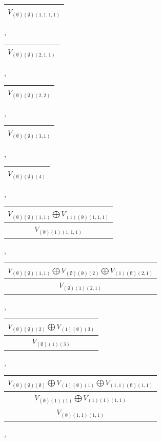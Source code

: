 \documentclass[letterpaper,11pt]{article}
\begin{document}
	\begin{tabular}{| c |}
		\hline
		$V_{(\emptyset)(\emptyset)(1,1,1,1)}$\\
		\hline
	\end{tabular}, 
	\begin{tabular}{| c |}
		\hline
		$V_{(\emptyset)(\emptyset)(2,1,1)}$\\
		\hline
	\end{tabular}, 
	\begin{tabular}{| c |}
		\hline
		$V_{(\emptyset)(\emptyset)(2,2)}$\\
		\hline
	\end{tabular}, 
	\begin{tabular}{| c |}
		\hline
		$V_{(\emptyset)(\emptyset)(3,1)}$\\
		\hline
	\end{tabular}, 
	\begin{tabular}{| c |}
		\hline
		$V_{(\emptyset)(\emptyset)(4)}$\\
		\hline
	\end{tabular}, 
	\begin{tabular}{| c |}
		\hline
		$V_{(\emptyset)(\emptyset)(1,1)}$$\bigoplus$$V_{(1)(\emptyset)(1,1,1)}$\\
		\hline
		$V_{(\emptyset)(1)(1,1,1)}$\\
		\hline
	\end{tabular}, 
	\newline 
	\begin{tabular}{| c |}
		\hline
		$V_{(\emptyset)(\emptyset)(1,1)}$$\bigoplus$$V_{(\emptyset)(\emptyset)(2)}$$\bigoplus$$V_{(1)(\emptyset)(2,1)}$\\
		\hline
		$V_{(\emptyset)(1)(2,1)}$\\
		\hline
	\end{tabular}, 
	\begin{tabular}{| c |}
		\hline
		$V_{(\emptyset)(\emptyset)(2)}$$\bigoplus$$V_{(1)(\emptyset)(3)}$\\
		\hline
		$V_{(\emptyset)(1)(3)}$\\
		\hline
	\end{tabular}, 
	\newline 
	\begin{tabular}{| c |}
		\hline
		$V_{(\emptyset)(\emptyset)(\emptyset)}$$\bigoplus$$V_{(1)(\emptyset)(1)}$$\bigoplus$$V_{(1,1)(\emptyset)(1,1)}$\\
		\hline
		$V_{(\emptyset)(1)(1)}$$\bigoplus$$V_{(1)(1)(1,1)}$\\
		\hline
		$V_{(\emptyset)(1,1)(1,1)}$\\
		\hline
	\end{tabular}, 
\end{document}
